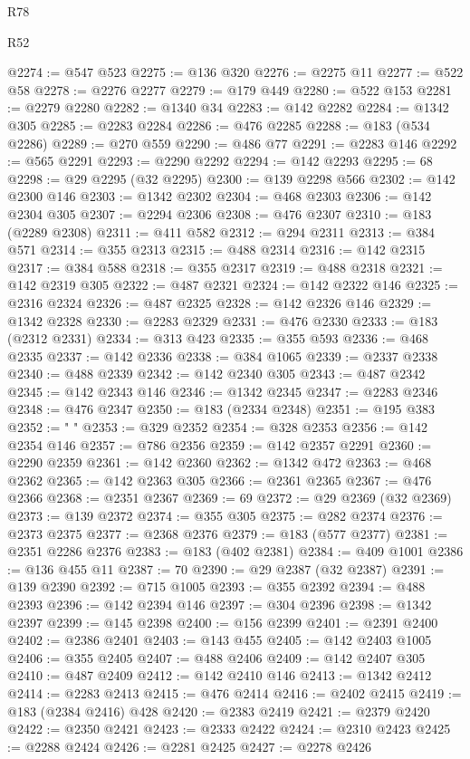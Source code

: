 \begin{lexlean}{R78}
\begin{lexlean}{R52}
\begin{coremodule}
{{{{{{{{{{{{{{{{{{{{{{{{{{{{{{{{{{{{{{{{{{{{{{{{{{{{{{{{{{{{{{{{{{{{{{{{{{{{{{{{{{{{{{{{{{{{{{{{{{{{{{{{{{{{{{{{{{{{{{{{{{{{{{{{{{{{{{{{{{{{{{{{{{{{{{{{{{{{{{{{{{{{{{{{{{{{{{{{{{{{{{{{{{{{{{{{{{{{{{@2274 := @547 @523
@2275 := @136 @320
@2276 := @2275 @11
@2277 := @522 @58
@2278 := @2276 @2277
@2279 := @179 @449
@2280 := @522 @153
@2281 := @2279 @2280
@2282 := @1340 @34
@2283 := @142 @2282
@2284 := @1342 @305
@2285 := @2283 @2284
@2286 := @476 @2285
@2288 := @183 (@534 @2286)
@2289 := @270 @559
@2290 := @486 @77
@2291 := @2283 @146
@2292 := @565 @2291
@2293 := @2290 @2292
@2294 := @142 @2293
@2295 := 68
@2298 := @29 @2295 (@32 @2295)
@2300 := @139 @2298 @566
@2302 := @142 @2300 @146
@2303 := @1342 @2302
@2304 := @468 @2303
@2306 := @142 @2304 @305
@2307 := @2294 @2306
@2308 := @476 @2307
@2310 := @183 (@2289 @2308)
@2311 := @411 @582
@2312 := @294 @2311
@2313 := @384 @571
@2314 := @355 @2313
@2315 := @488 @2314
@2316 := @142 @2315
@2317 := @384 @588
@2318 := @355 @2317
@2319 := @488 @2318
@2321 := @142 @2319 @305
@2322 := @487 @2321
@2324 := @142 @2322 @146
@2325 := @2316 @2324
@2326 := @487 @2325
@2328 := @142 @2326 @146
@2329 := @1342 @2328
@2330 := @2283 @2329
@2331 := @476 @2330
@2333 := @183 (@2312 @2331)
@2334 := @313 @423
@2335 := @355 @593
@2336 := @468 @2335
@2337 := @142 @2336
@2338 := @384 @1065
@2339 := @2337 @2338
@2340 := @488 @2339
@2342 := @142 @2340 @305
@2343 := @487 @2342
@2345 := @142 @2343 @146
@2346 := @1342 @2345
@2347 := @2283 @2346
@2348 := @476 @2347
@2350 := @183 (@2334 @2348)
@2351 := @195 @383
@2352 := " "
@2353 := @329 @2352
@2354 := @328 @2353
@2356 := @142 @2354 @146
@2357 := @786 @2356
@2359 := @142 @2357 @2291
@2360 := @2290 @2359
@2361 := @142 @2360
@2362 := @1342 @472
@2363 := @468 @2362
@2365 := @142 @2363 @305
@2366 := @2361 @2365
@2367 := @476 @2366
@2368 := @2351 @2367
@2369 := 69
@2372 := @29 @2369 (@32 @2369)
@2373 := @139 @2372
@2374 := @355 @305
@2375 := @282 @2374
@2376 := @2373 @2375
@2377 := @2368 @2376
@2379 := @183 (@577 @2377)
@2381 := @2351 @2286 @2376
@2383 := @183 (@402 @2381)
@2384 := @409 @1001
@2386 := @136 @455 @11
@2387 := 70
@2390 := @29 @2387 (@32 @2387)
@2391 := @139 @2390
@2392 := @715 @1005
@2393 := @355 @2392
@2394 := @488 @2393
@2396 := @142 @2394 @146
@2397 := @304 @2396
@2398 := @1342 @2397
@2399 := @145 @2398
@2400 := @156 @2399
@2401 := @2391 @2400
@2402 := @2386 @2401
@2403 := @143 @455
@2405 := @142 @2403 @1005
@2406 := @355 @2405
@2407 := @488 @2406
@2409 := @142 @2407 @305
@2410 := @487 @2409
@2412 := @142 @2410 @146
@2413 := @1342 @2412
@2414 := @2283 @2413
@2415 := @476 @2414
@2416 := @2402 @2415
@2419 := @183 (@2384 @2416) @428
@2420 := @2383 @2419
@2421 := @2379 @2420
@2422 := @2350 @2421
@2423 := @2333 @2422
@2424 := @2310 @2423
@2425 := @2288 @2424
@2426 := @2281 @2425
@2427 := @2278 @2426
}}}}}}}}}}}}}}}}}}}}}}}}}}}}}}}}}}}}}}}}}}}}}}}}}}}}}}}}}}}}}}}}}}}}}}}}}}}}}}}}}}}}}}}}}}}}}}}}}}}}}}}}}}}}}}}}}}}}}}}}}}}}}}}}}}}}}}}}}}}}}}}}}}}}}}}}}}}}}}}}}}}}}}}}}}}}}}}}}}}}}}}}}}}}}}}}}}}}}}
\end{coremodule}
\end{lexlean}
\end{lexlean}
